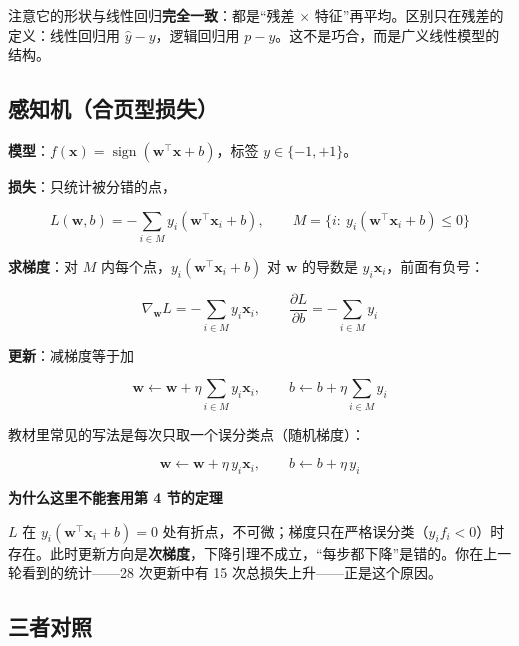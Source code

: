 \documentclass[UTF8, a4paper, zihao=-4, fontset=none]{ctexart}
\begin{document}
注意它的形状与线性回归\textbf{完全一致}：都是“残差 $\times$ 特征”再平均。区别只在残差的定义：线性回归用 $\hat{y}-y$，逻辑回归用 $p-y$。这不是巧合，而是广义线性模型的结构。




\subsection{感知机（合页型损失）}



\textbf{模型}：$f(\mathbf{x})=\operatorname{sign}(\mathbf{w}^\top\mathbf{x}+b)$，标签 $y\in\{-1,+1\}$。



\textbf{损失}：只统计被分错的点，


\[
L(\mathbf{w},b)=-\sum_{i\in M}y_i\left(\mathbf{w}^\top\mathbf{x}_i+b\right),\qquad M=\{i:\ y_i(\mathbf{w}^\top\mathbf{x}_i+b)\le0\}
\]


\textbf{求梯度}：对 $M$ 内每个点，$y_i(\mathbf{w}^\top\mathbf{x}_i+b)$ 对 $\mathbf{w}$ 的导数是 $y_i\mathbf{x}_i$，前面有负号：


\[
\nabla_{\mathbf{w}}L=-\sum_{i\in M}y_i\mathbf{x}_i,\qquad \frac{\partial L}{\partial b}=-\sum_{i\in M}y_i
\]


\textbf{更新}：减梯度等于加


\[
\mathbf{w}\leftarrow\mathbf{w}+\eta\sum_{i\in M}y_i\mathbf{x}_i,\qquad b\leftarrow b+\eta\sum_{i\in M}y_i
\]


教材里常见的写法是每次只取一个误分类点（随机梯度）：


\[
\mathbf{w}\leftarrow\mathbf{w}+\eta\,y_i\mathbf{x}_i,\qquad b\leftarrow b+\eta\,y_i
\]


\begin{warnbox}
{\bfseries\sffamily\small\color{warn} 为什么这里不能套用第 4 节的定理}\par\vspace{2pt}
$L$ 在 $y_i(\mathbf{w}^\top\mathbf{x}_i+b)=0$ 处有折点，不可微；梯度只在严格误分类（$y_if_i<0$）时存在。此时更新方向是\textbf{次梯度}，下降引理不成立，“每步都下降”是错的。你在上一轮看到的统计——28 次更新中有 15 次总损失上升——正是这个原因。


\end{warnbox}




\subsection{三者对照}
\end{document}
